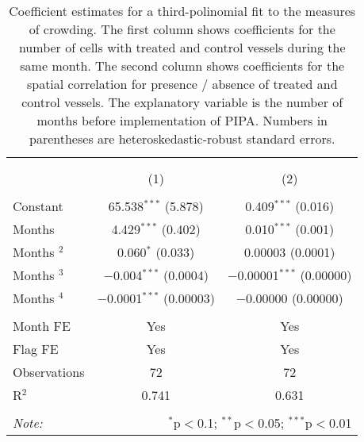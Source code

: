 
\begin{table}[!htbp] \centering 
  \caption{\label{tab:main_DID}Coefficient estimates for a third-polinomial fit to the measures of crowding. The first column shows coefficients for the number of cells with treated and control vessels during the same month. The second column shows coefficients for the spatial correlation for presence / absence of treated and control vessels. The explanatory variable is the number of months before implementation of PIPA. Numbers in parentheses are heteroskedastic-robust standard errors.} 
  \label{} 
\footnotesize 
\begin{tabular}{@{\extracolsep{1pt}}lcc} 
\\[-1.8ex]\hline 
\hline \\[-1.8ex] 
\\[-1.8ex] & (1) & (2)\\ 
\hline \\[-1.8ex] 
 Constant & 65.538$^{***}$ (5.878) & 0.409$^{***}$ (0.016) \\ 
  Months & 4.429$^{***}$ (0.402) & 0.010$^{***}$ (0.001) \\ 
  Months $^2$ & 0.060$^{*}$ (0.033) & 0.00003 (0.0001) \\ 
  Months $^3$ & $-$0.004$^{***}$ (0.0004) & $-$0.00001$^{***}$ (0.00000) \\ 
  Months $^4$ & $-$0.0001$^{***}$ (0.00003) & $-$0.00000 (0.00000) \\ 
 \hline \\[-1.8ex] 
Month FE & Yes & Yes \\ 
Flag FE & Yes & Yes \\ 
Observations & 72 & 72 \\ 
R$^{2}$ & 0.741 & 0.631 \\ 
\hline 
\hline \\[-1.8ex] 
\textit{Note:}  & \multicolumn{2}{r}{$^{*}$p$<$0.1; $^{**}$p$<$0.05; $^{***}$p$<$0.01} \\ 
\end{tabular} 
\end{table} 

